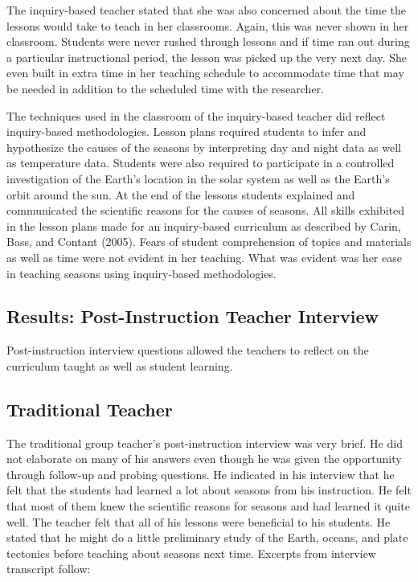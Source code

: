 \documentclass[11.5pt]{sig-alternate} %
\begin{document}
\begin{large}
The inquiry-based teacher stated that she was also concerned about the time the lessons would take to teach in her classrooms. Again, this was never shown in her classroom. Students were never rushed through lessons and if time ran out during a particular instructional period, the lesson was picked up the very next day. She even built in extra time in her teaching schedule to accommodate time that may be needed in addition to the scheduled time with the researcher.  

The techniques used in the classroom of the inquiry-based teacher did reflect inquiry-based methodologies.  Lesson plans required students to infer and hypothesize the causes of the seasons by interpreting day and night data as well as temperature data.  Students were also required to participate in a controlled investigation of the Earth’s location in the solar system as well as the Earth’s orbit around the sun.  At the end of the lessons students explained and communicated the scientific reasons for the causes of seasons.  All skills exhibited in the lesson plans made for an inquiry-based curriculum as described by Carin, Bass, and Contant (2005).  Fears of student comprehension of topics and materials as well as time were not evident in her teaching. What was evident was her ease in teaching seasons using inquiry-based methodologies.

\subsection*{Results: Post-Instruction Teacher Interview}

Post-instruction interview questions allowed the teachers to reflect on the curriculum taught as well as student learning.  
	
\subsection*{ Traditional Teacher}

The traditional group teacher’s post-instruction interview was very brief. He did not elaborate on many of his answers even though he was given the opportunity through follow-up and probing questions. He indicated in his interview that he felt that the students had learned a lot about seasons from his instruction. He felt that most of them knew the scientific reasons for seasons and had learned it quite well.  The teacher felt that all of his lessons were beneficial to his students. He stated that he might do a little preliminary study of the Earth, oceans, and plate tectonics before teaching about seasons next time. Excerpts from interview transcript follow:


\end{large}
\end{document}
